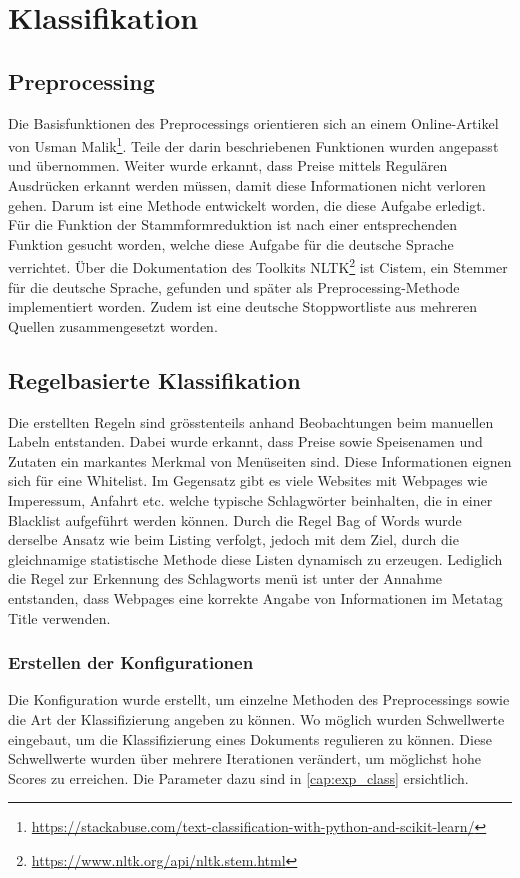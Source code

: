 \section{Klassifikation}
\subsection{Preprocessing}
Die Basisfunktionen des Preprocessings orientieren sich an einem Online-Artikel von Usman Malik\footnote{\url{https://stackabuse.com/text-classification-with-python-and-scikit-learn/}}.
Teile der darin beschriebenen Funktionen wurden angepasst und übernommen.
Weiter wurde erkannt, dass Preise mittels Regulären Ausdrücken erkannt werden müssen, damit diese Informationen nicht verloren gehen.
Darum ist eine Methode entwickelt worden, die diese Aufgabe erledigt.
Für die Funktion der Stammformreduktion ist nach einer entsprechenden Funktion gesucht worden, welche diese Aufgabe für die deutsche Sprache verrichtet.
Über die Dokumentation des Toolkits NLTK\footnote{\url{https://www.nltk.org/api/nltk.stem.html}} ist Cistem, ein Stemmer für die deutsche Sprache, gefunden und später als Preprocessing-Methode implementiert worden.
Zudem ist eine deutsche Stoppwortliste aus mehreren Quellen zusammengesetzt worden.
\subsection{Regelbasierte Klassifikation}
Die erstellten Regeln sind grösstenteils anhand Beobachtungen beim manuellen Labeln entstanden.
Dabei wurde erkannt, dass Preise sowie Speisenamen und Zutaten ein markantes Merkmal von Menüseiten sind.
Diese Informationen eignen sich für eine Whitelist.
Im Gegensatz gibt es viele Websites mit Webpages wie \glqq Imperessum\grqq{}, \glqq Anfahrt\grqq{} etc. welche typische Schlagwörter beinhalten, die in einer Blacklist aufgeführt werden können.
Durch die Regel \glqq Bag of Words\grqq{} wurde derselbe Ansatz wie beim Listing verfolgt, jedoch mit dem Ziel, durch die gleichnamige statistische Methode diese Listen dynamisch zu erzeugen.
Lediglich die Regel zur Erkennung des Schlagworts \glqq menü\grqq{} ist unter der Annahme entstanden, dass Webpages eine korrekte Angabe von Informationen im Metatag \glqq Title\grqq{} verwenden.
\subsubsection{Erstellen der Konfigurationen}
Die Konfiguration wurde erstellt, um einzelne Methoden des Preprocessings sowie die Art der Klassifizierung angeben zu können.
Wo möglich wurden Schwellwerte eingebaut, um die Klassifizierung eines Dokuments regulieren zu können.
Diese Schwellwerte wurden über mehrere Iterationen verändert, um möglichst hohe Scores zu erreichen.
Die Parameter dazu sind in \cref{cap:exp_class} ersichtlich.

